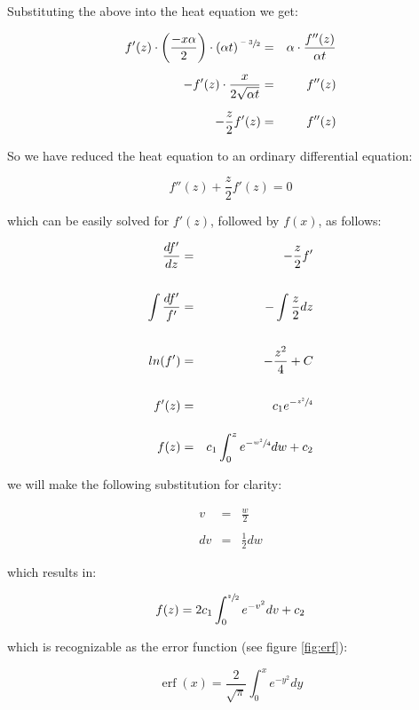 \documentclass{report}
\DeclareMathOperator{\erf}{erf}
\begin{document}
Substituting the above into the heat equation we get:\bigskip

\begin{eqnarray*} 
f'(z) \cdot \left( \frac{-x \alpha}{2} \right) \cdot (\alpha t)^{\sfrac{-3}{2}} & = & \alpha \cdot \frac{f''(z)}{\alpha t}   \\\\
                                       -f'(z) \cdot \frac{x}{2 \sqrt{\alpha t}} & = & f''(z)  \\\\
                                                             -\frac{z}{2} f'(z) & = & f''(z) 
\end{eqnarray*}\medskip

So we have reduced the heat equation to an ordinary differential equation:\bigskip

\[ f''(z) + \frac{z}{2} f'(z) = 0 \]\medskip

which can be easily solved for $f'(z)$, followed by $f(x)$, as follows:\bigskip

\begin{eqnarray*} 
  \frac{d f'}{d z} & = & - \frac{z}{2} f' \\\\
     \int \frac{d f'}{f'} & = & - \int \frac{z}{2} d z \\\\
                   ln(f') & = & - \frac{z^2}{4} + C \\\\
                    f'(z) & = & c_1 e^{-\sfrac{z^2}{4}} \\\\
                     f(z) & = & c_1 \int_0^z e^{-\sfrac{w^2}{4}} d w  + c_2
\end{eqnarray*}\medskip

we will make the following substitution for clarity:\bigskip

\begin{eqnarray*}  
    v & = & \frac{w}{2} \\\\
  d v & = & \frac{1}{2} d w 
\end{eqnarray*}\medskip

which results in:\bigskip

\[ f(z) = 2 c_1 \int_0^{\sfrac{z}{2}} e^{-v^2} d v  + c_2 \]\medskip

which is recognizable as the error function (see figure \ref{fig:erf}):\bigskip

\[ \erf(x) = \frac{2}{\sqrt{\pi}} \int_0^x e^{-y^2} d y \]\medskip
\end{document}
